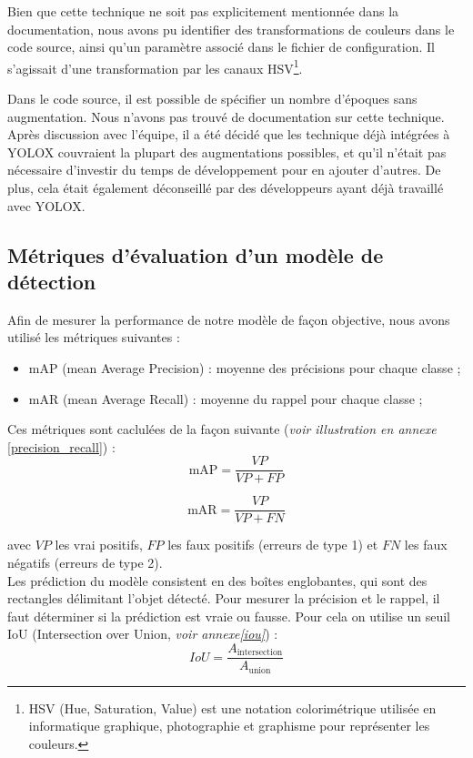 Bien que cette technique ne soit pas explicitement mentionnée dans la documentation,
nous avons pu identifier des transformations de couleurs dans le code source,
ainsi qu'un paramètre associé dans le fichier de configuration. Il s'agissait 
d'une transformation par les canaux HSV\footnote{HSV (Hue, Saturation, Value) est une notation colorimétrique utilisée en informatique graphique, photographie et graphisme pour représenter les couleurs.}.

Dans le code source, il est possible de spécifier un nombre d'époques sans augmentation.
Nous n'avons pas trouvé de documentation sur cette technique.\\

Après discussion avec l'équipe, il a été décidé que les technique déjà intégrées à YOLOX
couvraient la plupart des augmentations possibles, et qu'il n'était pas nécessaire d'investir
du temps de développement pour en ajouter d'autres. De plus, cela était également déconseillé
par des développeurs ayant déjà travaillé avec YOLOX.\\

\subsection{Métriques d'évaluation d'un modèle de détection}

Afin de mesurer la performance de notre modèle de façon objective,
nous avons utilisé les métriques suivantes :
\begin{itemize}
    \item mAP (mean Average Precision) : moyenne des précisions pour chaque classe ;
    \item mAR (mean Average Recall) : moyenne du rappel pour chaque classe ;
\end{itemize}

Ces métriques sont caclulées de la façon suivante (\textit{voir illustration en annexe }
\ref{precision_recall}) :\\

$$
\text{mAP} = \frac{VP}{VP + FP}
$$

$$
\text{mAR} = \frac{VP}{VP + FN}
$$

avec $VP$ les vrai positifs, $FP$ les faux positifs (erreurs de type 1) et 
$FN$ les faux négatifs (erreurs de type 2).\\

Les prédiction du modèle consistent en des boîtes englobantes, qui sont des rectangles délimitant
l'objet détecté. Pour mesurer la précision et le rappel, il faut déterminer si la prédiction
est vraie ou fausse. Pour cela on utilise un seuil IoU (Intersection over Union,
\textit{voir annexe\ref{iou}}) :
\[
    IoU = \frac{A_{\text{intersection}}}{A_{\text{union}}}
\]

